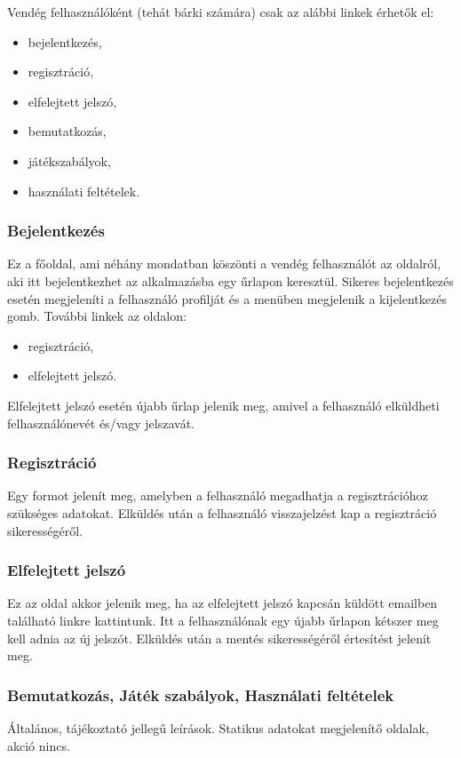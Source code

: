 Vendég felhasználóként (tehát bárki számára) csak az alábbi linkek érhetők el:
\begin{itemize}
	\item bejelentkezés,
	\item regisztráció,
	\item elfelejtett jelszó,
	\item bemutatkozás,
	\item játékszabályok,
	\item használati feltételek.
\end{itemize}

\subsubsection{Bejelentkezés}
Ez a főoldal, ami néhány mondatban köszönti a vendég felhasználót az oldalról, aki itt bejelentkezhet az alkalmazásba egy űrlapon keresztül.
Sikeres bejelentkezés esetén megjeleníti a felhasználó profilját és a menüben megjelenik a kijelentkezés gomb.
További linkek az oldalon:
\begin{itemize}
	\item regisztráció,
	\item elfelejtett jelszó.
\end{itemize}
Elfelejtett jelszó esetén újabb űrlap jelenik meg, amivel a felhasználó elküldheti felhasználónevét és/vagy jelszavát.


\subsubsection{Regisztráció}
Egy formot jelenít meg, amelyben a felhasználó megadhatja a regisztrációhoz szükséges adatokat. Elküldés után a felhasználó visszajelzést kap a regisztráció sikerességéről.

\subsubsection{Elfelejtett jelszó}
Ez az oldal akkor jelenik meg, ha az elfelejtett jelszó kapcsán küldött emailben található linkre kattintunk. Itt a felhasználónak egy újabb űrlapon kétszer meg kell adnia az új jelszót. Elküldés után a mentés sikerességéről értesítést jelenít meg.

\subsubsection{Bemutatkozás, Játék szabályok, Használati feltételek}
Általános, tájékoztató jellegű leírások. Statikus adatokat megjelenítő oldalak, akció nincs.

